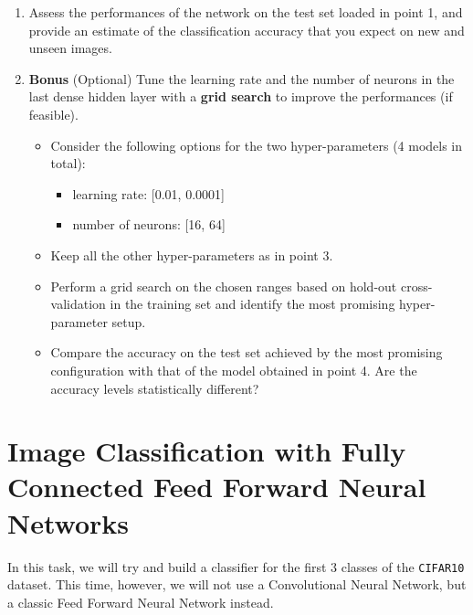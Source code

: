 \documentclass[11pt]{scrartcl}
\begin{document}
\begin{enumerate}
\item Assess the performances of the network on the test set loaded in point 1, and provide an estimate of the classification accuracy that you expect on new and unseen images.
\item \textbf{Bonus} (Optional) Tune the learning rate and the number of neurons in the last dense hidden layer with a \textbf{grid search} to improve the performances (if feasible).
\begin{itemize}
\item Consider the following options for the two hyper-parameters (4 models in total):
\begin{itemize}
\item learning rate: [0.01, 0.0001]
\item number of neurons: [16, 64]
\end{itemize}
\item Keep all the other hyper-parameters as in point 3.
\item Perform a grid search on the chosen ranges based on hold-out cross-validation in the training set and identify the most promising hyper-parameter setup.
\item Compare the accuracy on the test set achieved by the most promising configuration with that of the model obtained in point 4. Are the accuracy levels statistically different?
\end{itemize}
\end{enumerate}

\newpage
\section{Image Classification with Fully Connected Feed Forward Neural Networks}

In this task, we will try and build a classifier for the first 3 classes of the \texttt{CIFAR10} dataset. 
This time, however, we will not use a Convolutional Neural Network, but a classic Feed Forward Neural Network instead.
\end{document}
